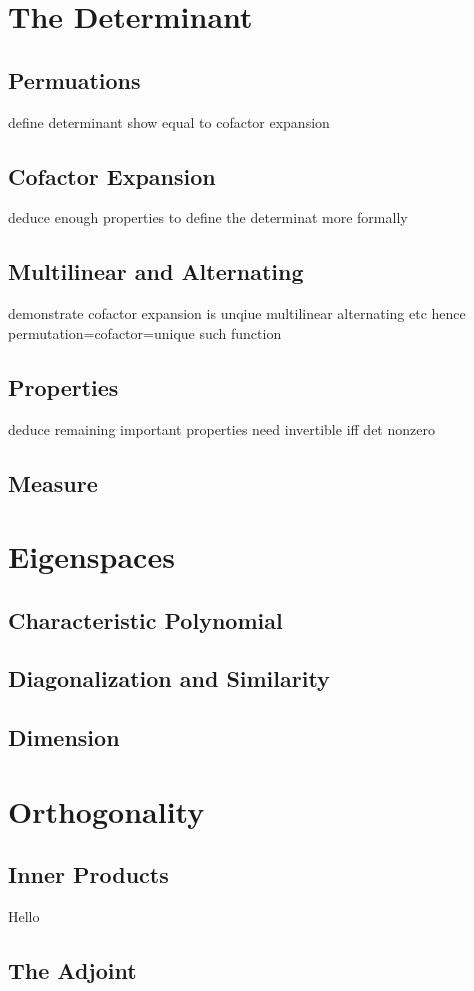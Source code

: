 \documentclass[oneside, 12pt]{book}
\theoremstyle{definition}
\begin{document}
\chapter{The Determinant}
\section{Permuations}
define determinant
show equal to cofactor expansion
\section{Cofactor Expansion}
deduce enough properties to define the determinat more formally
\section{Multilinear and Alternating}
demonstrate cofactor expansion is unqiue multilinear alternating etc
hence permutation=cofactor=unique such function
\section{Properties}
deduce remaining important properties
need invertible iff det nonzero
\section{Measure}
\chapter{Eigenspaces}
\section{Characteristic Polynomial}
\section{Diagonalization and Similarity}
\section{Dimension}
\chapter{Orthogonality}
\section{Inner Products}
Hello

\section{The Adjoint}
\end{document}
